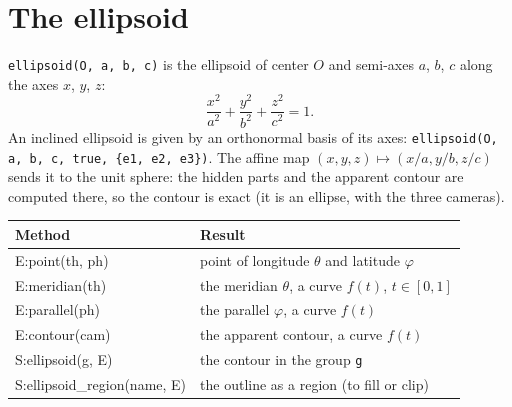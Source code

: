 \documentclass[11pt]{article}
\newcommand\code[1]{\texttt{#1}}
\newenvironment{example}[1]
  {\def\exfile{#1.tex}\VerbatimOut{\exfile}}
  {\endVerbatimOut
   \VerbatimInput[fontsize=\small, frame=single]{\exfile}
   \begin{center}\end{center}}
\begin{document}
\begin{example}{ex-zone}
\end{example}

\section{The ellipsoid}

\code{ellipsoid(O, a, b, c)} is the ellipsoid of center $O$ and semi-axes
$a$, $b$, $c$ along the axes $x$, $y$, $z$:
\[\frac{x^2}{a^2}+\frac{y^2}{b^2}+\frac{z^2}{c^2}=1.\]
An inclined ellipsoid
is given by an orthonormal basis of its axes:
\code{ellipsoid(O, a, b, c, true, \{e1, e2, e3\})}. The affine map
$(x, y, z)\mapsto(x/a, y/b, z/c)$ sends it to the unit sphere: the hidden
parts and the apparent contour are computed there, so the contour is exact
(it is an ellipse, with the three cameras).

\begin{center}
\begin{tabular}{>{\ttfamily}l p{8.3cm}}
\toprule
\textrm{Method} & Result \\
\midrule
E:point(th, ph)    & point of longitude $\theta$ and latitude $\varphi$ \\
E:meridian(th)     & the meridian $\theta$, a curve $f(t)$, $t\in[0,1]$ \\
E:parallel(ph)     & the parallel $\varphi$, a curve $f(t)$ \\
E:contour(cam)     & the apparent contour, a curve $f(t)$ \\
S:ellipsoid(g, E)  & the contour in the group \code{g} \\
S:ellipsoid\_region(name, E) & the outline as a region (to fill or clip) \\
\bottomrule
\end{tabular}
\end{center}
\end{document}
